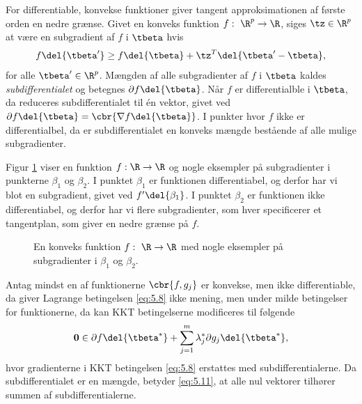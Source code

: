 For differentiable, konvekse funktioner giver tangent approksimationen af første orden en nedre grænse.
Givet en konveks funktion \(f: \ \R^p \rightarrow \R\), siges \(\tz \in \R^p\) at være en subgradient af \(f\) i \(\tbeta\) hvis
\begin{align*}
f \del{\tbeta'} \geq f \del{\tbeta} + \tz^T \del{ \tbeta' - \tbeta}, 
\end{align*}
for alle \(\tbeta' \in \R^p\).
Mængden af alle subgradienter af \(f\) i \(\tbeta\) kaldes \textit{subdifferentialet} og betegnes \(\partial f \del{\tbeta}\).
Når \(f\) er differentialble i \(\tbeta\), da reduceres subdifferentialet til én vektor, givet ved \(\partial f \del{\tbeta} = \cbr{\nabla f \del{\tbeta}}\).
I punkter hvor \(f\) ikke er differentialbel, da er subdifferentialet en konveks mængde bestående af alle mulige subgradienter.

Figur \ref{fig:subgradients} viser en funktion \(f : \R \rightarrow \R\) og nogle eksempler på subgradienter i punkterne \(\beta_1\) og \(\beta_2\).
I punktet \(\beta_1\) er funktionen differentiabel, og derfor har vi blot en subgradient, givet ved \(f' \del{\beta_1}\). I punktet \(\beta_2\) er funktionen ikke differentiabel, og derfor har vi flere subgradienter, som hver specificerer et tangentplan, som giver en nedre grænse på \(f\).
%
\begin{figure}[H]
\centering
\scalebox{1.2}{}
\caption{En konveks funktion \(f : \ \R \rightarrow \R\) med nogle eksempler på subgradienter i \(\beta_1\) og \(\beta_2\).} \label{fig:subgradients}
\end{figure}
%
Antag mindst en af funktionerne \(\cbr{f, g_j}\) er konvekse, men ikke differentiable, da giver Lagrange betingelsen \eqref{eq:5.8} ikke mening, men under milde betingelser for funktionerne, da kan KKT betingelserne modificeres til følgende
\begin{align}
\mathbf{0} \in \partial f \del{\tbeta^*} + \sum_{j=1}^m \lambda_j^* \partial g_j \del{\tbeta^*}, \label{eq:5.11}
\end{align}
hvor gradienterne i KKT betingelsen \eqref{eq:5.8} erstattes med subdifferentialerne.
Da subdifferentialet er en mængde, betyder \eqref{eq:5.11}, at alle nul vektorer tilhører summen af subdifferentialerne.

